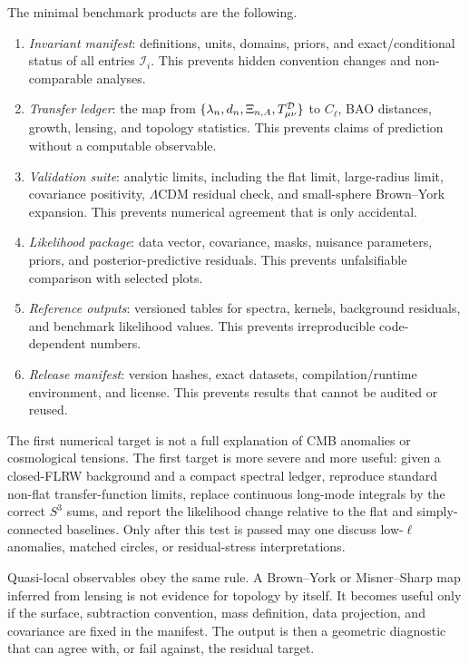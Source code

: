 \documentclass[
  aps,
  prd,
  reprint,
  superscriptaddress,
  nofootinbib,
  floatfix,
  longbibliography
]{revtex4-2}
\newcommand{\Inv}{\mathcal I}
\begin{document}
The minimal benchmark products are the following.
\begin{enumerate}
\item \emph{Invariant manifest}: definitions, units, domains, priors, and
exact/conditional status of all entries \(\Inv_i\).  This prevents hidden
convention changes and non-comparable analyses.
\item \emph{Transfer ledger}: the map from
\(\{\lambda_n,d_n,\Xi_{n,A},T^{\cal D}_{\mu\nu}\}\) to \(C_\ell\), BAO
distances, growth, lensing, and topology statistics.  This prevents
claims of prediction without a computable observable.
\item \emph{Validation suite}: analytic limits, including the flat
limit, large-radius limit, covariance positivity, \(\Lambda\)CDM
residual check, and small-sphere Brown--York expansion.  This prevents
numerical agreement that is only accidental.
\item \emph{Likelihood package}: data vector, covariance, masks,
nuisance parameters, priors, and posterior-predictive residuals.  This
prevents unfalsifiable comparison with selected plots.
\item \emph{Reference outputs}: versioned tables for spectra, kernels,
background residuals, and benchmark likelihood values.  This prevents
irreproducible code-dependent numbers.
\item \emph{Release manifest}: version hashes, exact datasets,
compilation/runtime environment, and license.  This prevents results
that cannot be audited or reused.
\end{enumerate}


The first numerical target is not a full explanation of CMB anomalies or
cosmological tensions.  The first target is more severe and more useful:
given a closed-FLRW background and a compact spectral ledger, reproduce
standard non-flat transfer-function limits, replace continuous long-mode
integrals by the correct \(S^3\) sums, and report the likelihood change
relative to the flat and simply-connected baselines.  Only after this
test is passed may one discuss low-\(\ell\) anomalies, matched circles,
or residual-stress interpretations.

Quasi-local observables obey the same rule.  A Brown--York or
Misner--Sharp map inferred from lensing is not evidence for topology by
itself.  It becomes useful only if the surface, subtraction convention,
mass definition, data projection, and covariance are fixed in the
manifest.  The output is then a geometric diagnostic that can agree with,
or fail against, the residual target.
\end{document}
